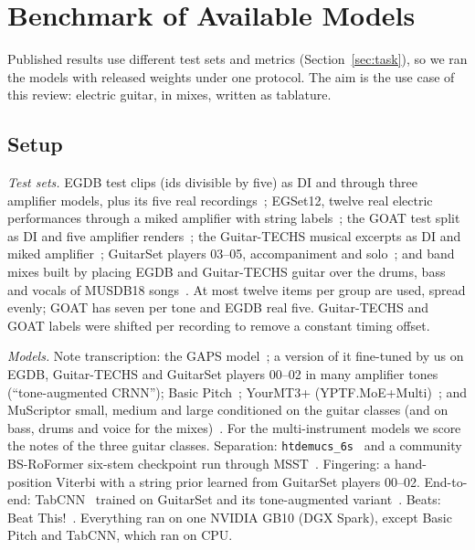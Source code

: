 \section{Benchmark of Available Models}
\label{sec:benchmark}

Published results use different test sets and metrics
(Section~\ref{sec:task}), so we ran the models with released weights under
one protocol. The aim is the use case of this review: electric guitar, in
mixes, written as tablature.

\subsection{Setup}
\emph{Test sets.} EGDB test clips (ids divisible by five) as DI and through
three amplifier models, plus its five real recordings~\cite{chen2022egdb};
EGSet12, twelve real electric performances through a miked amplifier with
string labels~\cite{pedroza2024tones}; the GOAT test split as DI and five
amplifier renders~\cite{loth2025goat}; the Guitar-TECHS musical excerpts as DI
and miked amplifier~\cite{pedroza2025guitartechs}; GuitarSet players 03--05,
accompaniment and solo~\cite{xi2018guitarset}; and band mixes built by placing
EGDB and Guitar-TECHS guitar over the drums, bass and vocals of MUSDB18
songs~\cite{rafii2017musdb18}. At most twelve items per group are used,
spread evenly; GOAT has seven per tone and EGDB real five. Guitar-TECHS and GOAT
labels were shifted per recording to remove a constant timing offset.

\emph{Models.} Note transcription: the GAPS model~\cite{riley2024gaps}; a
version of it fine-tuned by us on EGDB, Guitar-TECHS and GuitarSet players
00--02 in many amplifier tones (``tone-augmented CRNN''); Basic
Pitch~\cite{bittner2022basicpitch}; YourMT3+ (YPTF.MoE+Multi)~\cite{chang2024yourmt3};
and MuScriptor small, medium and large conditioned on the guitar classes (and
on bass, drums and voice for the mixes)~\cite{rouard2026muscriptor}. For the
multi-instrument models we score the notes of the three guitar classes.
Separation: \texttt{htdemucs\_6s}~\cite{rouard2023htdemucs} and a community
BS-RoFormer six-stem checkpoint run through MSST~\cite{lu2023bsroformer,solovyev2026msst}.
Fingering: a hand-position Viterbi with a string prior learned from
GuitarSet players 00--02. End-to-end: TabCNN~\cite{wiggins2019tabcnn} trained
on GuitarSet and its tone-augmented variant~\cite{pedroza2024tones}. Beats:
Beat This!~\cite{foscarin2024beatthis}. Everything ran on one NVIDIA GB10
(DGX Spark), except Basic Pitch and TabCNN, which ran on CPU.

